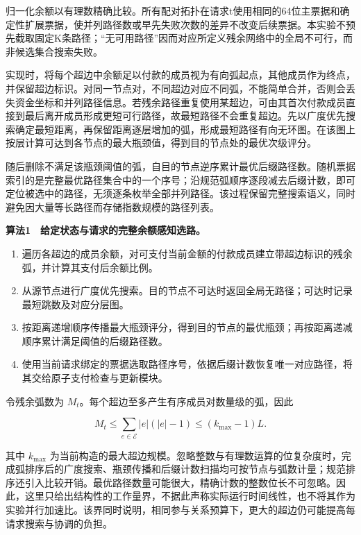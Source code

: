 \documentclass[UTF8,a4paper,twocolumn,fontset=none,zihao=5]{ctexart}
\newcommand{\algtitle}[1]{\par\Needspace{6\baselineskip}\smallskip\noindent\textbf{#1}\par\smallskip}
\begin{document}
归一化余额以有理数精确比较。所有配对拓扑在请求t使用相同的64位主票据和确定性扩展票据，使并列路径数或早先失败次数的差异不改变后续票据。本实验不预先截取固定K条路径；“无可用路径”因而对应所定义残余网络中的全局不可行，而非候选集合搜索失败。


实现时，将每个超边中余额足以付款的成员视为有向弧起点，其他成员作为终点，并保留超边标识。对同一节点对，不同超边对应不同弧，不能简单合并，否则会丢失资金坐标和并列路径信息。若残余路径重复使用某超边，可由其首次付款成员直接到最后离开成员形成更短可行路径，故最短路径不会重复超边。先以广度优先搜索确定最短距离，再保留距离逐层增加的弧，形成最短路径有向无环图。在该图上按层计算可达到各节点的最大瓶颈值，得到目的节点处的最优次级评分。


随后删除不满足该瓶颈阈值的弧，自目的节点逆序累计最优后缀路径数。随机票据索引的是完整最优路径集合中的一个序号；沿规范弧顺序逐段减去后缀计数，即可定位被选中的路径，无须逐条枚举全部并列路径。该过程保留完整搜索语义，同时避免因大量等长路径而存储指数规模的路径列表。


\algtitle{算法1　给定状态与请求的完整余额感知选路。}\begin{enumerate}

\item 遍历各超边的成员余额，对可支付当前金额的付款成员建立带超边标识的残余弧，并计算其支付后余额比例。

\item 从源节点进行广度优先搜索。目的节点不可达时返回全局无路径；可达时记录最短跳数及对应分层图。

\item 按距离递增顺序传播最大瓶颈评分，得到目的节点的最优瓶颈；再按距离递减顺序累计满足阈值的后缀路径数。

\item 使用当前请求绑定的票据选取路径序号，依据后缀计数恢复唯一对应路径，将其交给原子支付检查与更新模块。

\end{enumerate}

令残余弧数为 $M_t$。每个超边至多产生有序成员对数量级的弧，因此



\begin{equation}
M_t\leq\sum_{e\in\mathcal E}|e|(|e|-1)\leq(k_{\max}-1)L.
\label{eq:7}\end{equation}


其中 $k_{\max}$ 为当前构造的最大超边规模。忽略整数与有理数运算的位复杂度时，完成弧排序后的广度搜索、瓶颈传播和后缀计数扫描均可按节点与弧数计量；规范排序还引入比较开销。最优路径数量可能很大，精确计数的整数位长不可忽略。因此，这里只给出结构性的工作量界，不据此声称实际运行时间线性，也不将其作为实验并行加速比。该界同时说明，相同参与关系预算下，更大的超边仍可能提高每请求搜索与协调的负担。
\end{document}

